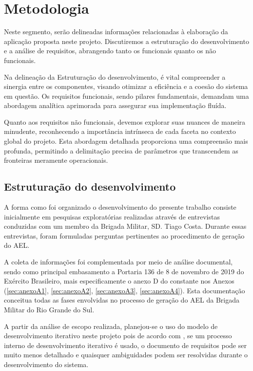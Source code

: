 \chapter{Metodologia}
Neste segmento, serão delineadas informações relacionadas à elaboração da aplicação proposta neste projeto. Discutiremos a estruturação do desenvolvimento e a análise de requisitos, abrangendo tanto os funcionais quanto os não funcionais.

Na delineação da Estruturação do desenvolvimento, é vital compreender a sinergia entre os componentes, visando otimizar a eficiência e a coesão do sistema em questão. Os requisitos funcionais, sendo pilares fundamentais, demandam uma abordagem analítica aprimorada para assegurar sua implementação fluída.

Quanto aos requisitos não funcionais, devemos explorar suas nuances de maneira minudente, reconhecendo a importância intrínseca de cada faceta no contexto global do projeto. Esta abordagem detalhada proporciona uma compreensão mais profunda, permitindo a delimitação precisa de parâmetros que transcendem as fronteiras meramente operacionais.

\section{Estruturação do desenvolvimento}\label{sec:estruturacao-desenvolvimento}
A forma como foi organizado o desenvolvimento do presente trabalho consiste inicialmente em pesquisas exploratórias realizadas através de entrevistas conduzidas com um membro da Brigada Militar, SD. Tiago Costa. Durante essas entrevistas, foram formuladas perguntas pertinentes ao procedimento de geração do AEL.

A coleta de informações foi complementada por meio de análise documental, sendo como principal embasamento a Portaria 136 de 8 de novembro de 2019 do Exército Brasileiro, mais especificamente o anexo D do  constante nos Anexos (\ref{sec:anexoA1}, \ref{sec:anexoA2}, \ref{sec:anexoA3}, \ref{sec:anexoA4}). Esta documentação conceitua todas as fases envolvidas no processo de geração do AEL da Brigada Militar do Rio Grande do Sul.

A partir da análise de escopo realizada, planejou-se o uso do modelo de desenvolvimento iterativo neste projeto pois de acordo com , se um processo interno de desenvolvimento iterativo é usado, o documento de requisitos pode ser muito menos detalhado e quaisquer ambiguidades podem ser resolvidas durante o desenvolvimento do sistema.

